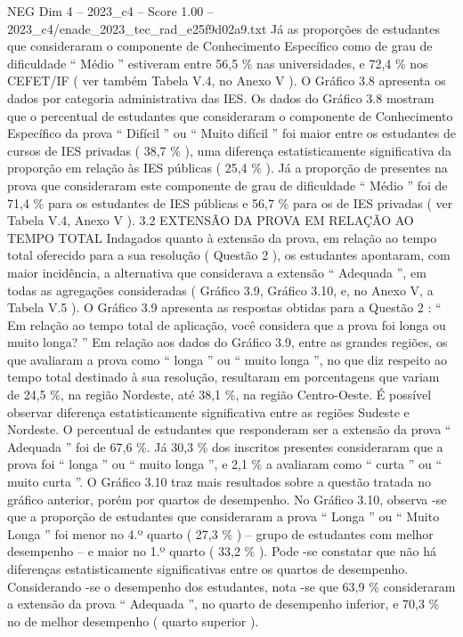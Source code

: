 \begin{textsample}{NEG Dim 4 – 2023\_c4 – Score 1.00 – 2023\_c4/enade\_2023\_tec\_rad\_e25f9d02a9.txt}
Já as proporções de estudantes que consideraram o componente de Conhecimento Específico como de grau de dificuldade “ Médio ” estiveram entre 56,5 \% nas universidades, e 72,4 \% nos CEFET/IF ( ver também Tabela V.4, no Anexo V ).
O Gráfico 3.8 apresenta os dados por categoria administrativa das IES.
Os dados do Gráfico 3.8 mostram que o percentual de estudantes que consideraram o componente de Conhecimento Específico da prova “ Difícil ” ou “ Muito difícil ” foi maior entre os estudantes de cursos de IES privadas ( 38,7 \% ), uma diferença estatisticamente significativa da proporção em relação às IES públicas ( 25,4 \% ).
Já a proporção de presentes na prova que consideraram este componente de grau de dificuldade “ Médio ” foi de 71,4 \% para os estudantes de IES públicas e 56,7 \% para os de IES privadas ( ver Tabela V.4, Anexo V ). 3.2 EXTENSÃO DA PROVA EM RELAÇÃO AO TEMPO TOTAL Indagados quanto à extensão da prova, em relação ao tempo total oferecido para a sua resolução ( Questão 2 ), os estudantes apontaram, com maior incidência, a alternativa que considerava a extensão “ Adequada ”, em todas as agregações consideradas ( Gráfico 3.9, Gráfico 3.10, e, no Anexo V, a Tabela V.5 ).
O Gráfico 3.9 apresenta as respostas obtidas para a Questão 2 : “ Em relação ao tempo total de aplicação, você considera que a prova foi longa ou muito longa? ” Em relação aos dados do Gráfico 3.9, entre as grandes regiões, os que avaliaram a prova como “ longa ” ou “ muito longa ”, no que diz respeito ao tempo total destinado à sua resolução, resultaram em porcentagens que variam de 24,5 \%, na região Nordeste, até 38,1 \%, na região Centro-Oeste.
É possível observar diferença estatisticamente significativa entre as regiões Sudeste e Nordeste.
O percentual de estudantes que responderam ser a extensão da prova “ Adequada ” foi de 67,6 \%.
Já 30,3 \% dos inscritos presentes consideraram que a prova foi “ longa ” ou “ muito longa ”, e 2,1 \% a avaliaram como “ curta ” ou “ muito curta ”.
O Gráfico 3.10 traz mais resultados sobre a questão tratada no gráfico anterior, porém por quartos de desempenho.
No Gráfico 3.10, observa -se que a proporção de estudantes que consideraram a prova “ Longa ” ou “ Muito Longa ” foi menor no 4.º quarto ( 27,3 \% ) – grupo de estudantes com melhor desempenho – e maior no 1.º quarto ( 33,2 \% ).
Pode -se constatar que não há diferenças estatisticamente significativas entre os quartos de desempenho.
Considerando -se o desempenho dos estudantes, nota -se que 63,9 \% consideraram a extensão da prova “ Adequada ”, no quarto de desempenho inferior, e 70,3 \% no de melhor desempenho ( quarto superior ).

\end{textsample}
